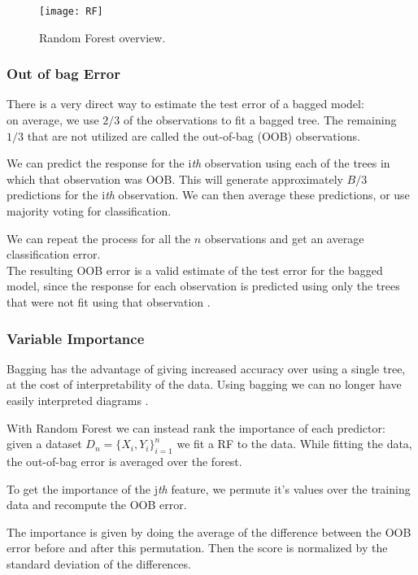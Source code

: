 \clearpage

\begin{figure}[H]
	\centering
	\texttt{[image: RF]}
	\caption{Random Forest overview.}
	\label{fig:RF}
\end{figure}

\subsubsection{Out of bag Error} \label{oob}
There is a very direct way to estimate the test error of a bagged model: \\
on average, we use $2/3$ of the observations to fit a bagged tree. The remaining $1/3$ that are not utilized are called the out-of-bag (OOB) observations. 

We can predict the response for the i\textit{th} observation using each of the trees in which that observation was OOB. This will generate approximately $B/3$ predictions for the i\textit{th} observation.
We can then average these predictions, or use majority voting for classification.

We can repeat the process for all the $n$ observations and get an average classification error. \\
The resulting OOB error is a valid estimate of the test error for the bagged model, since the response for each observation is predicted using only the trees that were not fit using that observation \cite{ISLR}. 

\subsubsection{Variable Importance}
Bagging has the advantage of giving increased accuracy over using a single tree, at the cost of interpretability of the data. Using bagging we can no longer have easily interpreted diagrams \cite{ISLR}.

With Random Forest we can instead rank the importance of each predictor: \\
given a dataset $D_n = \{X_i, Y_i\}_{i=1}^n$ we fit a RF to the data. While fitting the data, the out-of-bag error is averaged over the forest. 

To get the importance of the j\textit{th} feature, we permute it's values over the training data and recompute the OOB error.

The importance is given by doing the average of the difference between the OOB error before and after this permutation. Then the score is normalized by the standard deviation of the differences.

